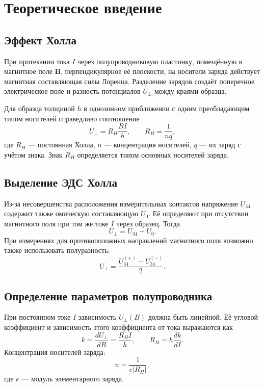 \documentclass[12pt,a4paper]{article}
\begin{document}
\section{Теоретическое введение}

\subsection{Эффект Холла}
При протекании тока $I$ через полупроводниковую пластинку,
помещённую в магнитное поле $\mathbf B$, перпендикулярное её
плоскости, на носители заряда действует магнитная составляющая
силы Лоренца. Разделение зарядов создаёт поперечное электрическое
поле и разность потенциалов $U_{\perp}$ между краями образца.

Для образца толщиной $h$ в однозонном приближении с одним
преобладающим типом носителей справедливо соотношение
\begin{equation}
    U_{\perp}=R_H\frac{BI}{h},\qquad R_H=\frac{1}{nq},
    \label{eq:hall}
\end{equation}
где $R_H$ --- постоянная Холла, $n$ --- концентрация носителей,
$q$ --- их заряд с учётом знака. Знак $R_H$ определяется типом
основных носителей заряда.

\subsection{Выделение ЭДС Холла}
Из-за несовершенства расположения измерительных контактов
напряжение $U_{34}$ содержит также омическую составляющую $U_0$.
Её определяют при отсутствии магнитного поля при том же токе
$I$ через образец. Тогда
\begin{equation}
    U_{\perp}=U_{34}-U_0.
    \label{eq:correction}
\end{equation}
При измерениях для противоположных направлений магнитного поля
возможно также использовать полуразность:
\begin{equation}
    U_{\perp}=\frac{U_{34}^{(+)}-U_{34}^{(-)}}{2}.
\end{equation}

\subsection{Определение параметров полупроводника}
При постоянном токе $I$ зависимость $U_{\perp}(B)$ должна быть
линейной. Её угловой коэффициент и зависимость этого коэффициента
от тока выражаются как
\begin{equation}
    k=\frac{dU_{\perp}}{dB}=\frac{R_H I}{h},
    \qquad
    R_H=h\frac{dk}{dI}.
    \label{eq:slopes}
\end{equation}
Концентрация носителей заряда:
\begin{equation}
    n=\frac{1}{e\lvert R_H\rvert},
    \label{eq:concentration}
\end{equation}
где $e$ --- модуль элементарного заряда.
\end{document}
